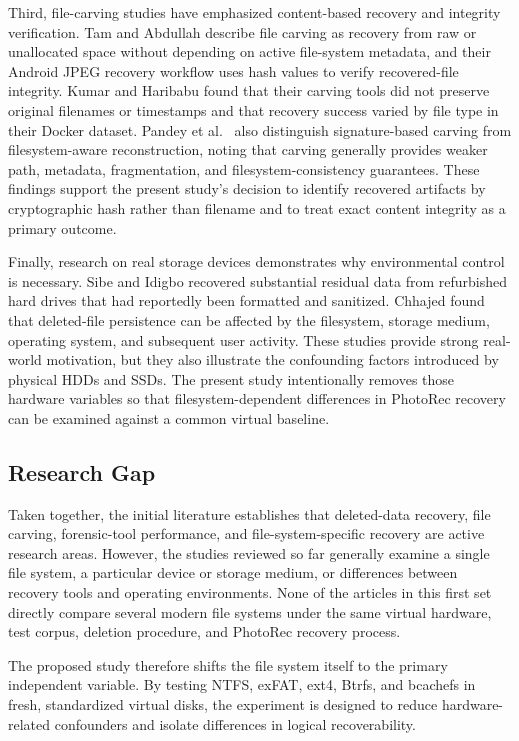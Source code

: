 \documentclass[conference]{IEEEtran}
\begin{document}
Third, file-carving studies have emphasized content-based recovery and integrity verification. Tam and Abdullah \cite{tam2024androidjpeg} describe file carving as recovery from raw or unallocated space without depending on active file-system metadata, and their Android JPEG recovery workflow uses hash values to verify recovered-file integrity. Kumar and Haribabu \cite{kumar2022docker} found that their carving tools did not preserve original filenames or timestamps and that recovery success varied by file type in their Docker dataset. Pandey et al.\ \cite{pandey2026btrfs} also distinguish signature-based carving from filesystem-aware reconstruction, noting that carving generally provides weaker path, metadata, fragmentation, and filesystem-consistency guarantees. These findings support the present study's decision to identify recovered artifacts by cryptographic hash rather than filename and to treat exact content integrity as a primary outcome.

Finally, research on real storage devices demonstrates why environmental control is necessary. Sibe and Idigbo \cite{sibe2025pii} recovered substantial residual data from refurbished hard drives that had reportedly been formatted and sanitized. Chhajed \cite{chhajed2024persistence} found that deleted-file persistence can be affected by the filesystem, storage medium, operating system, and subsequent user activity. These studies provide strong real-world motivation, but they also illustrate the confounding factors introduced by physical HDDs and SSDs. The present study intentionally removes those hardware variables so that filesystem-dependent differences in PhotoRec recovery can be examined against a common virtual baseline.

\subsection{Research Gap}

Taken together, the initial literature establishes that deleted-data recovery, file carving, forensic-tool performance, and file-system-specific recovery are active research areas. However, the studies reviewed so far generally examine a single file system, a particular device or storage medium, or differences between recovery tools and operating environments. None of the articles in this first set directly compare several modern file systems under the same virtual hardware, test corpus, deletion procedure, and PhotoRec recovery process.

The proposed study therefore shifts the file system itself to the primary independent variable. By testing NTFS, exFAT, ext4, Btrfs, and bcachefs in fresh, standardized virtual disks, the experiment is designed to reduce hardware-related confounders and isolate differences in logical recoverability.
\end{document}
